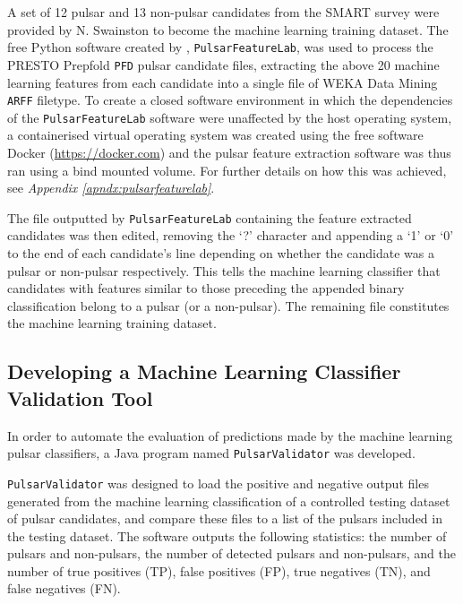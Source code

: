 \documentclass{article}
\begin{document}
A set of 12 pulsar and 13 non-pulsar candidates from the SMART survey were provided by N. Swainston to become the machine learning training dataset. The free Python software created by \textcite{lyon}, \verb|PulsarFeatureLab|, was used to process the PRESTO Prepfold \verb|PFD| pulsar candidate files, extracting the above 20 machine learning features from each candidate into a single file of WEKA Data Mining \verb|ARFF| filetype. To create a closed software environment in which the dependencies of the \verb|PulsarFeatureLab| software were unaffected by the host operating system, a containerised virtual operating system was created using the free software Docker (\href{https://docker.com}{https://docker.com}) and the pulsar feature extraction software was thus ran using a bind mounted volume. For further details on how this was achieved, see \emph{Appendix \ref{apndx:pulsarfeaturelab}}.

The file outputted by \verb|PulsarFeatureLab| containing the feature extracted candidates was then edited, removing the `?' character and appending a `1' or `0' to the end of each candidate's line depending on whether the candidate was a pulsar or non-pulsar respectively. This tells the machine learning classifier that candidates with features similar to those preceding the appended binary classification belong to a pulsar (or a non-pulsar). The remaining file constitutes the machine learning training dataset.

\subsection{Developing a Machine Learning Classifier Validation Tool}
\label{sec:methodvalidate}

In order to automate the evaluation of predictions made by the machine learning pulsar classifiers, a Java program named \verb|PulsarValidator| was developed.

\verb|PulsarValidator| was designed to load the positive and negative output files generated from the machine learning classification of a controlled testing dataset of pulsar candidates, and compare these files to a list of the pulsars included in the testing dataset. The software outputs the following statistics: the number of pulsars and non-pulsars, the number of detected pulsars and non-pulsars, and the number of true positives (TP), false positives (FP), true negatives (TN), and false negatives (FN). 
\end{document}
